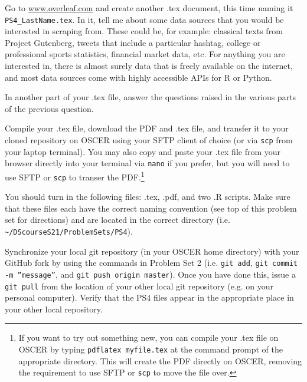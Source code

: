 \documentclass[12pt,english]{exam}
\begin{document}
\begin{questions}
\question Go to \url{www.overleaf.com} and create another .tex document, this time naming it \texttt{PS4\_LastName.tex}. In it, tell me about some data sources that you would be interested in scraping from. These could be, for example: classical texts from Project Gutenberg, tweets that include a particular hashtag, college or professional sports statistics, financial market data, etc. For anything you are interested in, there is almost surely data that is freely available on the internet, and most data sources come with highly accessible APIs for R or Python.

In another part of your .tex file, answer the questions raised in the various parts of the previous question.

\question Compile your .tex file, download the PDF and .tex file, and transfer it to your cloned repository on OSCER using your SFTP client of choice (or via \texttt{scp} from your laptop terminal). You may also copy and paste your .tex file from your browser directly into your terminal via \texttt{nano} if you prefer, but you will need to use SFTP or \texttt{scp} to transer the PDF.\footnote{If you want to try out something new, you can compile your .tex file on OSCER by typing \texttt{pdflatex myfile.tex} at the command prompt of the appropriate directory. This will create the PDF directly on OSCER, removing the requirement to use SFTP or \texttt{scp} to move the file over.}

\question You should turn in the following files: .tex, .pdf,  and two .R scripts.  Make sure that these files each have the correct naming convention (see top of this problem set for directions) and are located in the correct directory (i.e. \texttt{\textasciitilde/DScourseS21/ProblemSets/PS4}).

\question Synchronize your local git repository (in your OSCER home directory) with your GitHub fork by using the commands in Problem Set 2 (i.e. \texttt{git add}, \texttt{git commit -m ''message''}, and \texttt{git push origin master}). Once you have done this, issue a \texttt{git pull} from the location of your other local git repository (e.g. on your personal computer). Verify that the PS4 files appear in the appropriate place in your other local repository.

\end{questions}
\end{document}
